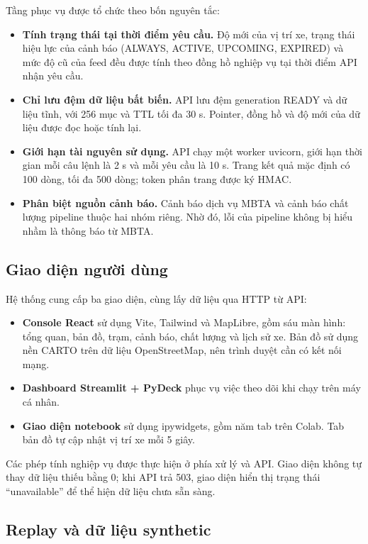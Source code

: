 Tầng phục vụ được tổ chức theo bốn nguyên tắc:
\begin{itemize}
    \item \textbf{Tính trạng thái tại thời điểm yêu cầu.} Độ mới của vị trí xe, trạng thái hiệu lực của cảnh báo (ALWAYS, ACTIVE, UPCOMING, EXPIRED) và mức độ cũ của feed đều được tính theo đồng hồ nghiệp vụ tại thời điểm API nhận yêu cầu.
    \item \textbf{Chỉ lưu đệm dữ liệu bất biến.} API lưu đệm generation READY và dữ liệu tĩnh, với 256 mục và TTL tối đa 30 s. Pointer, đồng hồ và độ mới của dữ liệu được đọc hoặc tính lại.
    \item \textbf{Giới hạn tài nguyên sử dụng.} API chạy một worker uvicorn, giới hạn thời gian mỗi câu lệnh là 2 s và mỗi yêu cầu là 10 s. Trang kết quả mặc định có 100 dòng, tối đa 500 dòng; token phân trang được ký HMAC.
    \item \textbf{Phân biệt nguồn cảnh báo.} Cảnh báo dịch vụ MBTA và cảnh báo chất lượng pipeline thuộc hai nhóm riêng. Nhờ đó, lỗi của pipeline không bị hiểu nhầm là thông báo từ MBTA.
\end{itemize}

\subsection{Giao diện người dùng}

Hệ thống cung cấp ba giao diện, cùng lấy dữ liệu qua HTTP từ API:
\begin{itemize}
    \item \textbf{Console React} sử dụng Vite, Tailwind và MapLibre, gồm sáu màn hình: tổng quan, bản đồ, trạm, cảnh báo, chất lượng và lịch sử xe. Bản đồ sử dụng nền CARTO trên dữ liệu OpenStreetMap, nên trình duyệt cần có kết nối mạng.
    \item \textbf{Dashboard Streamlit + PyDeck} phục vụ việc theo dõi khi chạy trên máy cá nhân.
    \item \textbf{Giao diện notebook} sử dụng ipywidgets, gồm năm tab trên Colab. Tab bản đồ tự cập nhật vị trí xe mỗi 5 giây.
\end{itemize}
Các phép tính nghiệp vụ được thực hiện ở phía xử lý và API. Giao diện không tự thay dữ liệu thiếu bằng 0; khi API trả 503, giao diện hiển thị trạng thái ``unavailable'' để thể hiện dữ liệu chưa sẵn sàng.

\subsection{Replay và dữ liệu synthetic}

